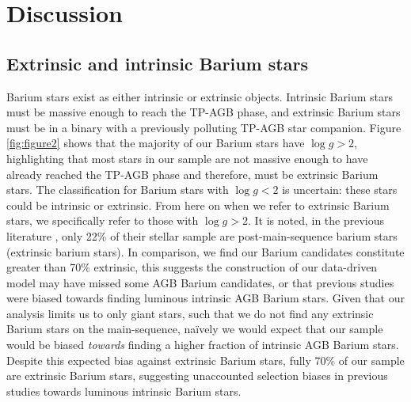 \documentclass[a4paper,fleqn,usenatbib]{mnras}
\begin{document}
\section{Discussion}  \label{sec:dis}


\subsection{Extrinsic and intrinsic Barium stars}
Barium stars exist as either intrinsic or extrinsic objects. Intrinsic Barium stars must be massive enough to reach the TP-AGB phase, and extrinsic Barium stars must be in a binary with a previously polluting TP-AGB star companion. Figure \ref{fig:figure2} shows that the majority of our Barium stars have $\log{g} > 2$, highlighting that most stars in our sample are not massive enough to have already reached the TP-AGB phase and therefore, must be extrinsic Barium stars. The classification for Barium stars with $\log{g} < 2$ is uncertain: these stars could be intrinsic or extrinsic. From here on when we refer to extrinsic Barium stars, we specifically refer to those with $\log{g} > 2$. It is noted, in the previous literature \citet{van2017}, only 22\% of their stellar sample are post-main-sequence barium stars (extrinsic barium stars). In comparison, we find our Barium candidates constitute greater than 70\% extrinsic, this suggests the construction of our data-driven model may have missed some AGB Barium candidates, or that previous studies were biased towards finding luminous intrinsic AGB Barium stars. Given that our analysis limits us to only giant stars, such that we do not find any extrinsic Barium stars on the main-sequence, na\"ively we would expect that our sample would be biased \emph{towards} finding a higher fraction of intrinsic AGB Barium stars. Despite this expected bias against extrinsic Barium stars, fully 70\% of our sample are extrinsic Barium stars, suggesting unaccounted selection biases in previous studies towards luminous intrinsic Barium stars.
\end{document}
